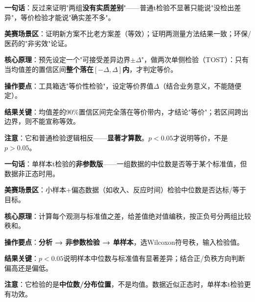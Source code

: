 
\begin{algobrief}
\textbf{一句话}：反过来证明"两组\textbf{没有实质差别}"——普通t检验不显著只能说"没检出差异"，等价检验才能说"确实差不多"。

\textbf{美赛场景区}：证明新方案不比老方案差（等效）；证明两测量方法结果一致；环保/医药的"非劣效"论证。

\textbf{核心原理}：预先设定一个"可接受差异边界$\pm\Delta$"，做两次单侧检验（TOST）：只有当均值差的置信区间\textbf{整个落在$[-\Delta,\Delta]$内}，才判定等价。

\textbf{操作要点}：工具箱选"等价性检验"，设定等价界值$\Delta$（结合业务意义，不能随便定）。

\textbf{结果关键}：均值差的90\%置信区间完全落在等价带内，才结论"等价"；若区间跨出边界，则不能宣称等效。

\textbf{注意}：它和普通检验逻辑相反——\textbf{显著才算数}。$p<0.05$才说明等价，不是$p>0.05$。
\end{algobrief}


\begin{algobrief}
\textbf{一句话}：单样本t检验的\textbf{非参数版}——一组数据的中位数是否等于某个标准值，但数据非正态时用。

\textbf{美赛场景区}：小样本+偏态数据（如收入、反应时间）检验中位数是否达标/等于目标。

\textbf{核心原理}：计算每个观测与标准值之差，给差值绝对值编秩，按正负号分两组比较秩和。

\textbf{操作要点}：\textbf{分析 → 非参数检验 → 单样本}，选Wilcoxon符号秩，输入检验值。

\textbf{结果关键}：$p<0.05$说明样本中位数与标准值有显著差异；结合正/负秩方向判断偏高还是偏低。

\textbf{注意}：它检验的是\textbf{中位数/分布位置}，不是均值。数据近似正态时，单样本t检验更有功效。
\end{algobrief}
